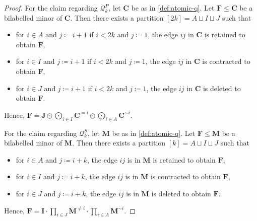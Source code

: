 \documentclass[11pt,a4paper]{article}
\theoremstyle{plain}
\theoremstyle{remark}
\theoremstyle{definition}
\begin{document}
\begin{proof}
	For the claim regarding $\mathcal{Q}_k^P$, 
	let $\boldsymbol{C}$ be as in \cref{def:atomic-q}.
	Let $\boldsymbol{F} \leq \boldsymbol{C}$ be a bilabelled minor of $\boldsymbol{C}$.
	Then there exists a partition $[2k] = A \sqcup I \sqcup J$ such that 
	\begin{itemize}
		\item for $i \in A$ and $j \coloneqq i+1$ if $i < 2k$ and $j \coloneqq 1$, the edge $ij$ in $\boldsymbol{C}$ is retained to obtain $\boldsymbol{F}$,
		\item for $i \in I$ and $j \coloneqq i+1$ if $i < 2k$ and $j \coloneqq 1$, the edge $ij$ in $\boldsymbol{C}$ is contracted to obtain $\boldsymbol{F}$,
		\item for $i \in J$ and $j \coloneqq i+1$ if $i < 2k$ and $j \coloneqq 1$, the edge $ij$ in $\boldsymbol{C}$ is deleted to obtain $\boldsymbol{F}$.
	\end{itemize}
	Hence, $\boldsymbol{F} = \boldsymbol{J} \odot \bigodot_{i\in I} \boldsymbol{C}^{=i} \odot \bigodot_{i \in A} \boldsymbol{C}^{\sim i}$.
	
	For the claim regarding $\mathcal{Q}_k^S$,
	let $\boldsymbol{M}$ be as in \cref{def:atomic-q}.
	Let $\boldsymbol{F} \leq \boldsymbol{M}$ be a bilabelled minor of $\boldsymbol{M}$.
	Then there exists a partition $[k] = A \sqcup I \sqcup J$ such that 
	\begin{itemize}
		\item for $i \in A$ and $j \coloneqq i+k$, the edge $ij$ is in $\boldsymbol{M}$ is retained to obtain $\boldsymbol{F}$,
		\item for $i \in I$ and $j \coloneqq i+k$, the edge $ij$ is in $\boldsymbol{M}$ is contracted to obtain $\boldsymbol{F}$,
		\item for $i \in J$ and $j \coloneqq i+k$, the edge $ij$ is in $\boldsymbol{M}$ is deleted to obtain $\boldsymbol{F}$.
	\end{itemize}
	Hence, $\boldsymbol{F} = \boldsymbol{I} \cdot \prod_{i \in J} \boldsymbol{M}^{\neq i} \cdot \prod_{i \in A} \boldsymbol{M}^{\sim i}$.
\end{proof}
\end{document}
